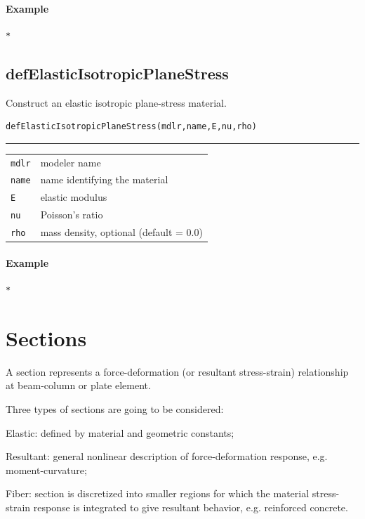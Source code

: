 \paragraph{Example}
\begin{verbatim}
*
\end{verbatim}

\subsection{defElasticIsotropicPlaneStress}
\noindent Construct an elastic isotropic plane-stress material.
\begin{verbatim}
defElasticIsotropicPlaneStress(mdlr,name,E,nu,rho)
\end{verbatim}
\vspace{-10pt}
{\color{grayLines} \rule{\linewidth}{0.25pt}}
\begin{center}
\begin{tabular}{lp{10cm}}
{\tt mdlr} & modeler name \\
{\tt name} & name identifying the material\\
{\tt E} & elastic modulus \\
{\tt nu} & Poisson's ratio \\
{\tt rho} &  mass density, optional (default = 0.0)\\
\end{tabular}
\end{center}
\paragraph{Example}
\begin{verbatim}
*
\end{verbatim}
\section{Sections}
A section represents a force-deformation (or resultant stress-strain) relationship at beam-column or plate element.

Three types of sections are going to be considered:
\begin{description}
\item{Elastic:} defined by material and geometric constants;
\item{Resultant:} general nonlinear description of force-deformation response, e.g. moment-curvature;
\item{Fiber:} section is discretized into smaller regions for which the material stress-strain response is integrated to give resultant behavior, e.g. reinforced concrete.
\end{description}
